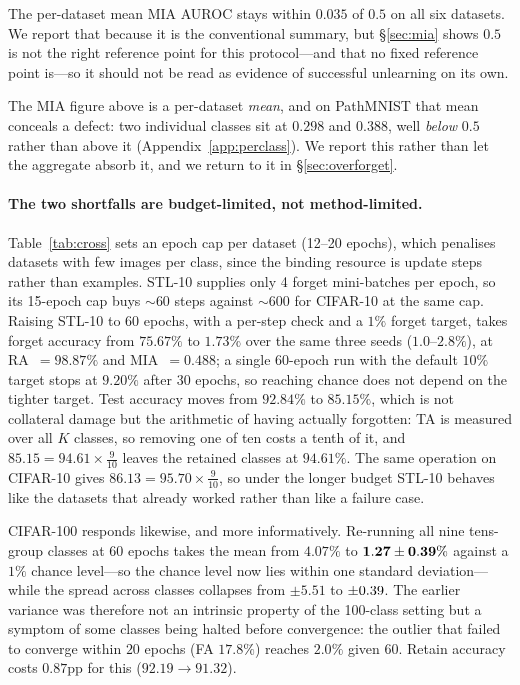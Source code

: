 \documentclass{article}
\newcommand{\rev}[1]{{\color{revisedB}#1}}
\theoremstyle{remark}
\theoremstyle{plain}
\begin{document}
The per-dataset mean MIA AUROC stays within $0.035$ of $0.5$ on all six
datasets. We report that because it is the conventional summary, but
\S\ref{sec:mia} shows $0.5$ is not the right reference point for this
protocol---and that no fixed reference point is---so it should not be read as
evidence of successful unlearning on its own.

The MIA figure above is a per-dataset \emph{mean}, and on PathMNIST that mean
conceals a defect: two individual classes sit at $0.298$ and $0.388$, well
\emph{below} $0.5$ rather than above it (Appendix~\ref{app:perclass}). We
report this rather than let the aggregate absorb it, and we return to it in
\S\ref{sec:overforget}.

\paragraph{The two shortfalls are budget-limited, not method-limited.}
\label{sec:crossdataset_stl}
\rev{Table~\ref{tab:cross} sets an epoch cap per dataset (12--20 epochs), which
penalises datasets with few images per class, since the binding resource is
update steps rather than examples. STL-10 supplies only 4 forget mini-batches
per epoch, so its 15-epoch cap buys ${\sim}60$ steps against ${\sim}600$ for
CIFAR-10 at the same cap. Raising STL-10 to 60 epochs, with a per-step check and
a $1\%$ forget target, takes forget accuracy from $75.67\%$ to
$\mathbf{1.73\%}$ over the same three seeds ($1.0$--$2.8\%$), at
RA~$=98.87\%$ and MIA~$=0.488$; a single 60-epoch run with the default $10\%$
target stops at $9.20\%$ after 30 epochs, so reaching chance does not depend on
the tighter target. Test accuracy moves from $92.84\%$ to $85.15\%$}, which
is not collateral damage but the arithmetic of having actually forgotten: TA is
measured over all $K$ classes, so removing one of ten costs a tenth of it, and
$85.15 = 94.61 \times \tfrac{9}{10}$ leaves the retained classes at $94.61\%$.
The same operation on CIFAR-10 gives $86.13 = 95.70 \times \tfrac{9}{10}$, so
under the longer budget STL-10 behaves like the datasets that already worked
rather than like a failure case.

CIFAR-100 responds likewise, and more informatively. Re-running all nine
tens-group classes at 60 epochs takes the mean from $4.07\%$ to
$\mathbf{1.27 \pm \rev{0.39}\%}$ against a $1\%$ chance level---so the chance level now
lies within one standard deviation---while the spread across classes collapses
from $\pm 5.51$ to $\pm \rev{0.39}$. The earlier variance was therefore not an
intrinsic property of the 100-class setting but a symptom of some classes being
halted before convergence: the outlier that failed to converge within $20$
epochs (FA $17.8\%$) reaches $2.0\%$ given $60$. Retain accuracy costs $0.87$pp
for this ($92.19 \to 91.32$).
\end{document}
